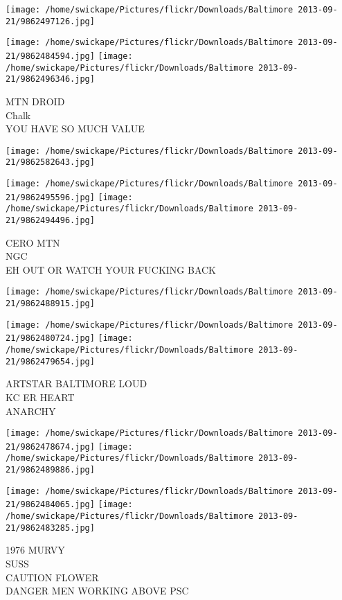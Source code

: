 \documentclass[10pt,letterpaper]{article}
\begin{document}
\texttt{[image: /home/swickape/Pictures/flickr/Downloads/Baltimore 2013-09-21/9862497126.jpg]}

\vspace{0.25in}
\texttt{[image: /home/swickape/Pictures/flickr/Downloads/Baltimore 2013-09-21/9862484594.jpg]}
\texttt{[image: /home/swickape/Pictures/flickr/Downloads/Baltimore 2013-09-21/9862496346.jpg]}

MTN DROID\\
Chalk\\
YOU HAVE SO MUCH VALUE
\pagebreak

\texttt{[image: /home/swickape/Pictures/flickr/Downloads/Baltimore 2013-09-21/9862582643.jpg]}

\vspace{0.25in}
\texttt{[image: /home/swickape/Pictures/flickr/Downloads/Baltimore 2013-09-21/9862495596.jpg]}
\texttt{[image: /home/swickape/Pictures/flickr/Downloads/Baltimore 2013-09-21/9862494496.jpg]}

CERO MTN\\
NGC\\
EH OUT OR WATCH YOUR FUCKING BACK
\pagebreak

\texttt{[image: /home/swickape/Pictures/flickr/Downloads/Baltimore 2013-09-21/9862488915.jpg]}

\vspace{0.25in}
\texttt{[image: /home/swickape/Pictures/flickr/Downloads/Baltimore 2013-09-21/9862480724.jpg]}
\texttt{[image: /home/swickape/Pictures/flickr/Downloads/Baltimore 2013-09-21/9862479654.jpg]}

ARTSTAR BALTIMORE LOUD\\
KC ER HEART\\
ANARCHY
\pagebreak

\texttt{[image: /home/swickape/Pictures/flickr/Downloads/Baltimore 2013-09-21/9862478674.jpg]}
\texttt{[image: /home/swickape/Pictures/flickr/Downloads/Baltimore 2013-09-21/9862489886.jpg]}

\texttt{[image: /home/swickape/Pictures/flickr/Downloads/Baltimore 2013-09-21/9862484065.jpg]}
\texttt{[image: /home/swickape/Pictures/flickr/Downloads/Baltimore 2013-09-21/9862483285.jpg]}

1976 MURVY\\
SUSS\\
CAUTION FLOWER\\
DANGER MEN WORKING ABOVE PSC
\pagebreak
\end{document}
